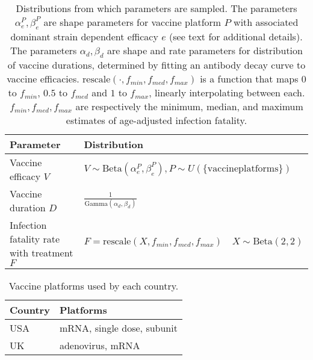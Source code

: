 \documentclass{article}
\begin{document}
\begin{table}

\caption{\label{tab:trajectory-sampling-parameters}Distributions from which parameters are sampled. The parameters $\alpha_e^P, \beta_e^P$ are shape parameters for vaccine platform $P$ with associated dominant strain dependent efficacy $e$ (see text for additional details). The parameters $\alpha_d, \beta_d$ are shape and rate parameters for distribution of vaccine durations, determined by fitting an antibody decay curve to vaccine efficacies. $\mathrm{rescale}(\cdot, f_{min}, f_{med}, f_{max})$ is a function that maps $0$ to $f_{min}$, $0.5$ to $f_{med}$ and $1$ to $f_{max}$, linearly interpolating between each. $f_{min}, f_{med}, f_{max}$ are respectively the minimum, median, and maximum estimates of age-adjusted infection fatality.}
\centering
\begin{tabular}[t]{ll}
\toprule
Parameter & Distribution\\
\midrule
Vaccine efficacy $V$ & $V\sim \mathrm{Beta}(\alpha_{e}^P, \beta_{e}^P), P\sim U(\{\mathrm{vaccine platforms}\})$\\
Vaccine duration $D$ & $\frac{1}{\mathrm{Gamma}(\alpha_{d}, \beta_d)}$\\
Infection fatality rate with treatment $F$ & $F = \mathrm{rescale}(X,f_{min}, f_{med}, f_{max})\quad X\sim \mathrm{Beta}(2,2)$\\
\bottomrule
\end{tabular}
\end{table}

\begin{table}

\caption{\label{tab:vaccine-platforms}Vaccine platforms used by each country.}
\centering
\begin{tabular}[t]{ll}
\toprule
Country & Platforms\\
\midrule
USA & mRNA, single dose, subunit\\
UK & adenovirus, mRNA\\
\bottomrule
\end{tabular}
\end{table}
\end{document}
